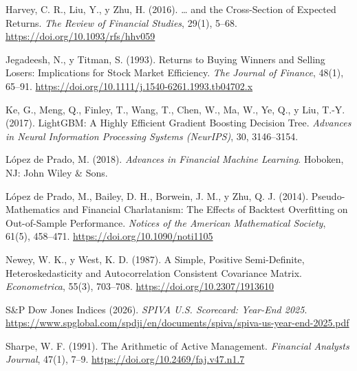 \begin{list}{}{%
  \setlength{\leftmargin}{2em}%
  \setlength{\itemindent}{-2em}%
  \setlength{\itemsep}{0.6em}%
  \setlength{\parsep}{0pt}%
}
\item Harvey, C. R., Liu, Y., y Zhu, H. (2016). \ldots{} and the Cross-Section of Expected Returns.
  \textit{The Review of Financial Studies}, 29(1), 5--68.
  \url{https://doi.org/10.1093/rfs/hhv059}

\item Jegadeesh, N., y Titman, S. (1993). Returns to Buying Winners and Selling Losers: Implications
  for Stock Market Efficiency. \textit{The Journal of Finance}, 48(1), 65--91.
  \url{https://doi.org/10.1111/j.1540-6261.1993.tb04702.x}

\item Ke, G., Meng, Q., Finley, T., Wang, T., Chen, W., Ma, W., Ye, Q., y Liu, T.-Y. (2017).
  LightGBM: A Highly Efficient Gradient Boosting Decision Tree.
  \textit{Advances in Neural Information Processing Systems (NeurIPS)}, 30, 3146--3154.

\item López de Prado, M. (2018). \textit{Advances in Financial Machine Learning}.
  Hoboken, NJ: John Wiley \& Sons.

\item López de Prado, M., Bailey, D. H., Borwein, J. M., y Zhu, Q. J. (2014). Pseudo-Mathematics and
  Financial Charlatanism: The Effects of Backtest Overfitting on Out-of-Sample Performance.
  \textit{Notices of the American Mathematical Society}, 61(5), 458--471.
  \url{https://doi.org/10.1090/noti1105}

\item Newey, W. K., y West, K. D. (1987). A Simple, Positive Semi-Definite, Heteroskedasticity and
  Autocorrelation Consistent Covariance Matrix. \textit{Econometrica}, 55(3), 703--708.
  \url{https://doi.org/10.2307/1913610}

\item S\&P Dow Jones Indices (2026). \textit{SPIVA U.S. Scorecard: Year-End 2025}.
  \url{https://www.spglobal.com/spdji/en/documents/spiva/spiva-us-year-end-2025.pdf}

\item Sharpe, W. F. (1991). The Arithmetic of Active Management.
  \textit{Financial Analysts Journal}, 47(1), 7--9.
  \url{https://doi.org/10.2469/faj.v47.n1.7}

\end{list}
